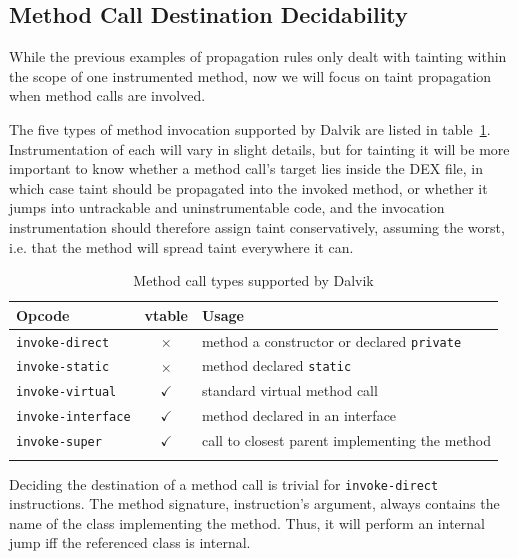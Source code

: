 \documentclass[12pt,twoside,notitlepage]{report}
\newcommand{\tick}{$\checkmark$}
\newcommand{\cross}{$\times$}
\begin{document}
\subsection{Method Call Destination Decidability}
\label{section:TaintPropagation_DestDecision}

While the previous examples of propagation rules only dealt with tainting within the scope of one instrumented method, now we will focus on taint propagation when method calls are involved. 

The five types of method invocation supported by Dalvik are listed in table~\ref{table:TaintPropagation_MethodCallTypes}. Instrumentation of each will vary in slight details, but for tainting it will be more important to know whether a method call's target lies inside the DEX file, in which case taint should be propagated into the invoked method, or whether it jumps into untrackable and uninstrumentable code, and the invocation instrumentation should therefore assign taint conservatively, assuming the worst, i.e. that the method will spread taint everywhere it can.

\begin{table}[h]
	\begin{center}
	\begin{tabular}{|l|c|l|}
		\firsthline
		\textbf{Opcode}         & \footnotesize{\textbf{vtable}} & \textbf{Usage} \\
		\hline
		\verb$invoke-direct$    & \cross          & method a constructor or declared \verb$private$ \\
		\verb$invoke-static$    & \cross          & method declared \verb$static$ \\
		\hline
		\verb$invoke-virtual$   & \tick           & standard virtual method call \\
		\verb$invoke-interface$ & \tick           & method declared in an interface \\
		\verb$invoke-super$     & \tick           & call to closest parent implementing the method \\
		\lasthline
	\end{tabular}
	\end{center}
	\caption{Method call types supported by Dalvik}
	\label{table:TaintPropagation_MethodCallTypes}
\end{table}

Deciding the destination of a method call is trivial for \verb$invoke-direct$ instructions. The method signature, instruction's argument, always contains the name of the class implementing the method. Thus, it will perform an internal jump iff the referenced class is internal.
\end{document}
